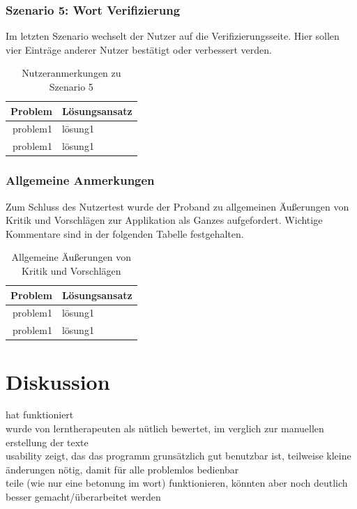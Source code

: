 \subsubsection{Szenario 5: Wort Verifizierung}

Im letzten Szenario wechselt der Nutzer auf die Verifizierungsseite. Hier sollen vier Einträge anderer Nutzer bestätigt oder verbessert verden.

\begin{table}[h!]
	\centering
	\begin{tabular}{|r|l|}
		\hline
		\textbf{Problem} & \textbf{Lösungsansatz}\\
		\hline
		\hline
		problem1 & lösung1\\
		\hline
		problem1 & lösung1\\
		\hline
	\end{tabular}
	\caption{Nutzeranmerkungen zu Szenario 5}
	\label{table:szenario5}
\end{table}


\subsubsection{Allgemeine Anmerkungen}

Zum Schluss des Nutzertest wurde der Proband zu allgemeinen Äußerungen von Kritik und Vorschlägen zur Applikation als Ganzes aufgefordert. Wichtige Kommentare sind in der folgenden Tabelle festgehalten.

\begin{table}[h!]
	\centering
	\begin{tabular}{|r|l|}
		\hline
		\textbf{Problem} & \textbf{Lösungsansatz}\\
		\hline
		\hline
		problem1 & lösung1\\
		\hline
		problem1 & lösung1\\
		\hline
	\end{tabular}
	\caption{Allgemeine Äußerungen von Kritik und Vorschlägen}
	\label{table:usertestgeneral}
\end{table}


\section{Diskussion}

hat funktioniert\\
wurde von lerntherapeuten als nütlich bewertet, im verglich zur manuellen erstellung der texte\\
usability zeigt, das das programm grunsätzlich gut benutzbar ist, teilweise kleine änderungen nötig, damit für alle problemlos bedienbar\\
teile (wie nur eine betonung im wort) funktionieren, könnten aber noch deutlich besser gemacht/überarbeitet werden\\

